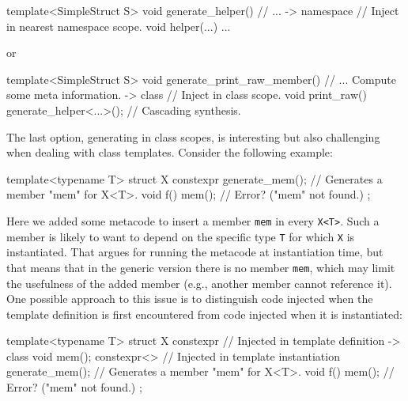\documentclass{wg21}
\newcommand{\cc}[1]{\texttt{#1}}
\begin{document}
\begin{cpp}
template<SimpleStruct S>
void generate_helper() {
  // ...
  -> namespace {  // Inject in nearest namespace scope.
    void helper(...) { ... }
  }
}
\end{cpp}

or

\begin{cpp}
template<SimpleStruct S>
void generate_print_raw_member() {
  // ... Compute some meta information.
  -> class {  // Inject in class scope.
    void print_raw() {
      generate_helper<...>();  // Cascading synthesis.
    }
  }
}
\end{cpp}

The last option, generating in class scopes, is interesting but also challenging
when dealing with class templates. Consider the following example:

\begin{cpp}
template<typename T> struct X {
  constexpr {
    generate_mem();  // Generates a member "mem" for X<T>.
  }
  void f() {
    mem();  // Error? ("mem" not found.)
  }
};
\end{cpp}

Here we added some metacode to insert a member \cc{mem} in every \cc{X<T>}.
Such a member is likely to want to depend on the specific type \cc{T} for
which \cc{X} is instantiated. That argues for running the metacode at
instantiation time, but that means that in the generic version there is
no member \cc{mem}, which may limit the usefulness of the added member
(e.g., another member cannot reference it). One possible approach to this
issue is to distinguish code injected when the template definition is first
encountered from code injected when it is instantiated:

\begin{cpp}
template<typename T> struct X {
  constexpr {  // Injected in template definition
    -> class { void mem(); }
  }
  constexpr<> {  // Injected in template instantiation
    generate_mem();  // Generates a member "mem" for X<T>.
  }
  void f() {
    mem();  // Error? ("mem" not found.)
  }
};
\end{cpp}
\end{document}
